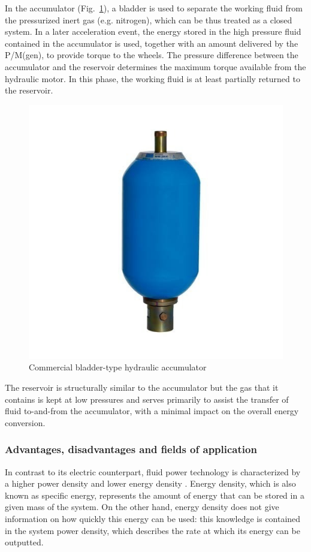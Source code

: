 \documentclass[11pt]{article}
\begin{document}
In the accumulator (Fig.~\ref{hydraulic_accumulator}), a bladder is used to separate the working fluid from the pressurized inert gas (e.g. nitrogen), which can be thus treated as a closed system. In a later acceleration event, the energy stored in the high pressure fluid contained in the accumulator is used, together with an amount delivered by the P/M(gen), to provide torque to the wheels. The pressure difference between the accumulator and the reservoir determines the maximum torque available from the hydraulic motor. In this phase, the working fluid is at least partially returned to the reservoir. 

\begin{figure}[H]
\centering
\includegraphics[width=.4\textwidth]{Images/State_of_the_art/Hydraulic Accumulator.jpg}
\caption{Commercial bladder-type hydraulic accumulator}
\label{hydraulic_accumulator}
\end{figure}

The reservoir is structurally similar to the accumulator but the gas that it contains is kept at low pressures and serves primarily to assist the transfer of fluid to-and-from the accumulator, with a minimal impact on the overall energy conversion. 

\subsubsection{Advantages, disadvantages and fields of application}

In contrast to its electric counterpart, fluid power technology is characterized by a higher power density and lower energy density \cite{f}. Energy density, which is also known as specific energy, represents the amount of energy that can be stored in a given mass of the system. On the other hand, energy density does not give information on how quickly this energy can be used: this knowledge is contained in the system power density, which describes the rate at which its energy can be outputted. 
\end{document}
